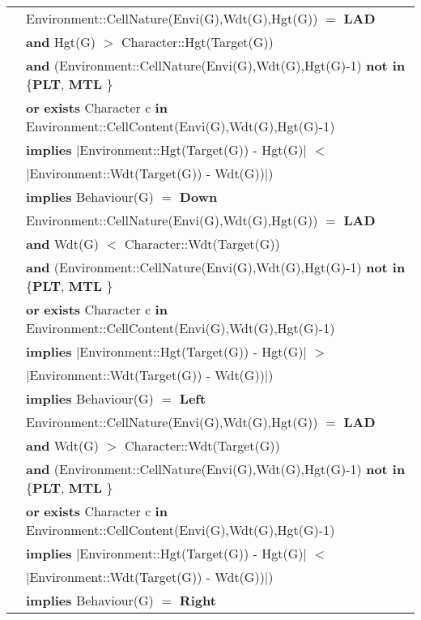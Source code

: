 \documentclass{article}
\begin{document}
\begin{tabular}{rl}
& \textrm{Environment::CellNature(Envi(G),Wdt(G),Hgt(G))} $=$ \textbf{LAD} \\
& \quad\quad \textbf{and} \textrm{Hgt(G)} $>$ \textrm{Character::Hgt(Target(G))} \\
& \quad\quad \textbf{and} (\textrm{Environment::CellNature(Envi(G),Wdt(G),Hgt(G)-1)} \textbf{not in} \{\textbf{PLT}, \textbf{MTL}  \} \\
& \quad\quad\quad\quad \textbf{or} \textbf{exists} \textrm{Character} c \textbf{in} \textrm{Environment::CellContent(Envi(G),Wdt(G),Hgt(G)-1)} \\
& \quad\quad\quad\quad \textbf{implies} $|$\textrm{Environment::Hgt(Target(G)) - Hgt(G)}$|$ $<$\\
& \quad\quad\quad\quad\quad $|$\textrm{Environment::Wdt(Target(G)) - Wdt(G)})$|$)\\
& \quad\quad \textbf{implies} \textrm{Behaviour(G)} $=$ \textbf{Down} \\

& \textrm{Environment::CellNature(Envi(G),Wdt(G),Hgt(G))} $=$ \textbf{LAD} \\
& \quad\quad \textbf{and} \textrm{Wdt(G)} $<$ \textrm{Character::Wdt(Target(G))} \\
& \quad\quad \textbf{and} (\textrm{Environment::CellNature(Envi(G),Wdt(G),Hgt(G)-1)} \textbf{not in} \{\textbf{PLT}, \textbf{MTL}  \} \\
& \quad\quad\quad\quad \textbf{or} \textbf{exists} \textrm{Character} c \textbf{in} \textrm{Environment::CellContent(Envi(G),Wdt(G),Hgt(G)-1)} \\
& \quad\quad\quad\quad \textbf{implies} $|$\textrm{Environment::Hgt(Target(G)) - Hgt(G)}$|$ $>$\\
& \quad\quad\quad\quad\quad $|$\textrm{Environment::Wdt(Target(G)) - Wdt(G)})$|$)\\
& \quad\quad \textbf{implies} \textrm{Behaviour(G)} $=$ \textbf{Left} \\

& \textrm{Environment::CellNature(Envi(G),Wdt(G),Hgt(G))} $=$ \textbf{LAD} \\
& \quad\quad \textbf{and} \textrm{Wdt(G)} $>$ \textrm{Character::Wdt(Target(G))} \\
& \quad\quad \textbf{and} (\textrm{Environment::CellNature(Envi(G),Wdt(G),Hgt(G)-1)} \textbf{not in} \{\textbf{PLT}, \textbf{MTL}  \} \\
& \quad\quad\quad\quad \textbf{or} \textbf{exists} \textrm{Character} c \textbf{in} \textrm{Environment::CellContent(Envi(G),Wdt(G),Hgt(G)-1)} \\
& \quad\quad\quad\quad \textbf{implies} $|$\textrm{Environment::Hgt(Target(G)) - Hgt(G)}$|$ $<$\\
& \quad\quad\quad\quad\quad $|$\textrm{Environment::Wdt(Target(G)) - Wdt(G)})$|$)\\
& \quad\quad \textbf{implies} \textrm{Behaviour(G)} $=$ \textbf{Right} \\


\end{tabular}
\end{document}

